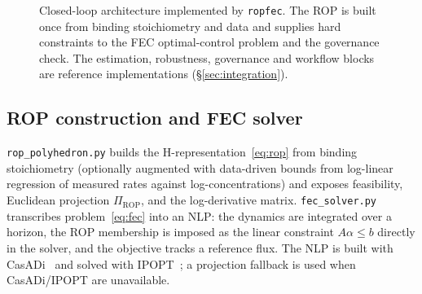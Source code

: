 \documentclass[11pt]{article}
\newcommand{\rop}{\mathrm{ROP}}
\begin{document}
\begin{figure}[t]
\centering
{}
\caption{Closed-loop architecture implemented by \texttt{ropfec}. The ROP is
built once from binding stoichiometry and data and supplies hard constraints to
the FEC optimal-control problem and the governance check. The estimation,
robustness, governance and workflow blocks are reference implementations
(\S\ref{sec:integration}).}
\label{fig:arch}
\end{figure}

\subsection{ROP construction and FEC solver}\label{sec:fec}

\texttt{rop\_polyhedron.py} builds the H-representation~\eqref{eq:rop} from
binding stoichiometry (optionally augmented with data-driven bounds from
log-linear regression of measured rates against log-concentrations) and exposes
feasibility, Euclidean projection $\Pi_{\rop}$, and the log-derivative matrix.
\texttt{fec\_solver.py} transcribes problem~\eqref{eq:fec} into an NLP: the
dynamics are integrated over a horizon, the ROP membership is imposed as the
linear constraint $A\alpha\le b$ directly in the solver, and the objective tracks
a reference flux. The NLP is built with CasADi~\citep{andersson2019casadi} and
solved with IPOPT~\citep{wachter2006ipopt}; a projection fallback is used when
CasADi/IPOPT are unavailable.
\end{document}
